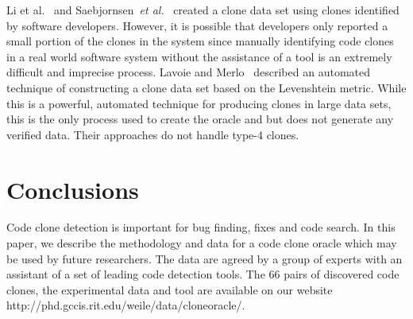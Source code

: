 \documentclass{sig-alternate}
\begin{document}
Li et al.~\cite{Li:2012:CCB:2337223.2337260} and Saebjornsen~\emph{et al.}~\cite{Saebjornsen:2009:DCC:1572272.1572287} created a clone data set using clones identified by software developers. However, it is possible that developers only reported a small portion of the clones in the system since manually identifying code clones in a real world software system without the assistance of a tool is an extremely difficult and imprecise process. Lavoie and Merlo~\cite{Lavoie:2011:ATC:1985404.1985411} described an automated technique of constructing a clone data set based on the Levenshtein metric. While this is a powerful, automated technique for producing clones in large data sets, this is the only process used to create the oracle and but does not generate any verified data. Their approaches do not handle type-4 clones.

\section{Conclusions}
\label{sec: conclusion}
Code clone detection is important for bug finding, fixes and code search. In this paper, we describe the methodology and data for a code clone oracle which may be used by future researchers. The data are agreed by a group of experts with an assistant of a set of leading code detection tools. The 66 pairs of discovered code clones, the experimental data and tool are available on our website http://phd.gccis.rit.edu/weile/data/cloneoracle/.





\end{document}
